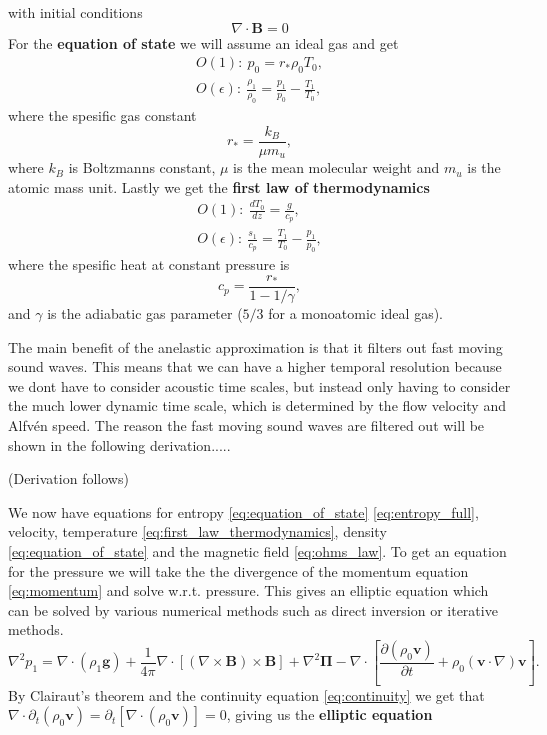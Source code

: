 with initial conditions
\begin{equation}
    \nabla\cdot\mathbf{B}=0
\end{equation}
For the \textbf{equation of state} we will assume an ideal gas and get
\begin{align}\label{eq:equation_of_state}
    O(1):\ p_0=r_*\rho_0T_0,\\
    O(\epsilon):\ \frac{\rho_1}{\rho_0}=\frac{p_1}{p_0}-\frac{T_1}{T_0},
\end{align}
where the spesific gas constant
\begin{equation}
    r_* = \frac{k_B}{\mu m_u},
\end{equation}
where $k_B$ is Boltzmanns constant, $\mu$ is the mean molecular weight and $m_u$ is the atomic mass unit. Lastly we get the \textbf{first law of thermodynamics}
\begin{align}\label{eq:first_law_thermodynamics}
    O(1):\ \frac{dT_0}{dz} = \frac{g}{c_p},\\
    O(\epsilon):\ \frac{s_1}{c_p} = \frac{T_1}{T_0}-\frac{p_1}{p_0},
\end{align}
where the spesific heat at constant pressure is
\begin{equation}
    c_p = \frac{r_*}{1-1/\gamma},
\end{equation}
and $\gamma$ is the adiabatic gas parameter ($5/3$ for a monoatomic ideal gas).

The main benefit of the anelastic approximation is that it filters out fast moving sound waves. This means that we can have a higher temporal resolution because we dont have to consider acoustic time scales, but instead only having to consider the much lower dynamic time scale, which is determined by the flow velocity and Alfvén speed. The reason the fast moving sound waves are filtered out will be shown in the following derivation.....

(Derivation follows)

We now have equations for entropy \ref{eq:equation_of_state} \ref{eq:entropy_full}, velocity, temperature \ref{eq:first_law_thermodynamics}, density \ref{eq:equation_of_state} and the magnetic field \ref{eq:ohms_law}. To get an equation for the pressure we will take the the divergence of the momentum equation \ref{eq:momentum} and solve w.r.t. pressure. This gives an elliptic equation which can be solved by various numerical methods such as direct inversion or iterative methods.
\begin{equation*}
    \nabla^2 p_1 = \nabla\cdot(\rho_1\mathbf{g}) + \frac{1}{4\pi}\nabla\cdot\left[(\nabla\times\mathbf{B})\times\mathbf{B} \right]+\nabla^2\mathbf{\Pi}-\nabla\cdot\left[\frac{\partial(\rho_0\mathbf{v})}{\partial t} +\rho_0(\mathbf{v}\cdot\nabla)\mathbf{v}\right].
\end{equation*}
By Clairaut's theorem and the continuity equation \ref{eq:continuity} we get that $\nabla\cdot\partial_t(\rho_0\mathbf{v})=\partial_t\left[\nabla\cdot(\rho_0\mathbf{v})\right]=0$, giving us the \textbf{elliptic equation}

